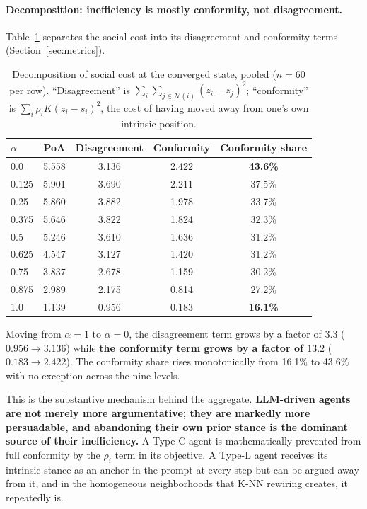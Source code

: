 \paragraph{Decomposition: inefficiency is mostly conformity, not disagreement.}
Table~\ref{tab:decomp} separates the social cost into its disagreement and conformity
terms (Section~\ref{sec:metrics}).

\begin{table}[t]
\centering
\caption{Decomposition of social cost at the converged state, pooled ($n = 60$ per row).
``Disagreement'' is $\sum_i\sum_{j \in \mathcal{N}(i)}(z_i - z_j)^2$; ``conformity'' is
$\sum_i \rho_i K (z_i - s_i)^2$, the cost of having moved away from one's own intrinsic
position.}
\label{tab:decomp}
\begin{tabular}{lcccc}
\toprule
$\alpha$ & PoA & Disagreement & Conformity & Conformity share \\
\midrule
0.0   & 5.558 & 3.136 & 2.422 & \textbf{43.6\%} \\
0.125 & 5.901 & 3.690 & 2.211 & 37.5\% \\
0.25  & 5.860 & 3.882 & 1.978 & 33.7\% \\
0.375 & 5.646 & 3.822 & 1.824 & 32.3\% \\
0.5   & 5.246 & 3.610 & 1.636 & 31.2\% \\
0.625 & 4.547 & 3.127 & 1.420 & 31.2\% \\
0.75  & 3.837 & 2.678 & 1.159 & 30.2\% \\
0.875 & 2.989 & 2.175 & 0.814 & 27.2\% \\
1.0   & 1.139 & 0.956 & 0.183 & \textbf{16.1\%} \\
\bottomrule
\end{tabular}
\end{table}

Moving from $\alpha = 1$ to $\alpha = 0$, the disagreement term grows by a factor of
$3.3$ ($0.956 \to 3.136$) while \textbf{the conformity term grows by a factor of $13.2$}
($0.183 \to 2.422$). The conformity share rises monotonically from 16.1\% to 43.6\% with
no exception across the nine levels.

This is the substantive mechanism behind the aggregate. \textbf{LLM-driven agents are not
merely more argumentative; they are markedly more persuadable, and abandoning their own
prior stance is the dominant source of their inefficiency.} A Type-C agent is
mathematically prevented from full conformity by the $\rho_i$ term in its objective. A
Type-L agent receives its intrinsic stance as an anchor in the prompt at every step but
can be argued away from it, and in the homogeneous neighborhoods that K-NN rewiring
creates, it repeatedly is.

